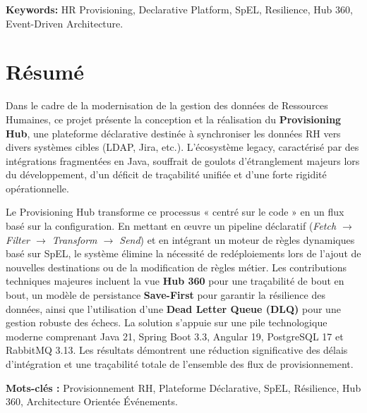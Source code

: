 \textbf{Keywords:} HR Provisioning, Declarative Platform, SpEL, Resilience, Hub 360, Event-Driven Architecture.
\newpage

\chapter*{Résumé}
Dans le cadre de la modernisation de la gestion des données de Ressources Humaines, ce projet présente la conception et la réalisation du \textbf{Provisioning Hub}, une plateforme déclarative destinée à synchroniser les données RH vers divers systèmes cibles (LDAP, Jira, etc.). L'écosystème legacy, caractérisé par des intégrations fragmentées en Java, souffrait de goulots d'étranglement majeurs lors du développement, d'un déficit de traçabilité unifiée et d'une forte rigidité opérationnelle.

Le Provisioning Hub transforme ce processus « centré sur le code » en un flux basé sur la configuration. En mettant en œuvre un pipeline déclaratif (\textit{Fetch $\rightarrow$ Filter $\rightarrow$ Transform $\rightarrow$ Send}) et en intégrant un moteur de règles dynamiques basé sur SpEL, le système élimine la nécessité de redéploiements lors de l'ajout de nouvelles destinations ou de la modification de règles métier. Les contributions techniques majeures incluent la vue \textbf{Hub 360} pour une traçabilité de bout en bout, un modèle de persistance \textbf{Save-First} pour garantir la résilience des données, ainsi que l'utilisation d'une \textbf{Dead Letter Queue (DLQ)} pour une gestion robuste des échecs. La solution s'appuie sur une pile technologique moderne comprenant Java 21, Spring Boot 3.3, Angular 19, PostgreSQL 17 et RabbitMQ 3.13. Les résultats démontrent une réduction significative des délais d'intégration et une traçabilité totale de l'ensemble des flux de provisionnement.

\textbf{Mots-clés :} Provisionnement RH, Plateforme Déclarative, SpEL, Résilience, Hub 360, Architecture Orientée Événements.
\newpage


